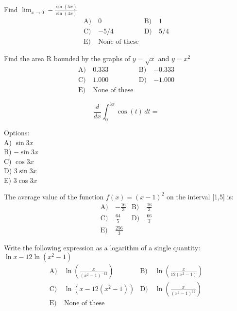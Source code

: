 \begin{problem}\label{PreCal-7}
Find $\lim _{x \rightarrow 0}-\frac{\sin (5 x)}{\sin (4 x)}$
\begin{align*}
\text{A)}\ & 0 &
\text{B)}\ &  1\\
\text{C)}\ & -5/4  &
\text{D)}\ & 5/4 \\
\text{E)}\ & \text{None of these}&
\end{align*}    
\end{problem}


\begin{problem}\label{PreCal-8}
Find the area $\mathrm{R}$ bounded by the graphs of $y=\sqrt{x}$ and $y=x^{2}$
\begin{align*}
\text{A)}\ & 0.333 &
\text{B)}\ & -0.333 \\
\text{C)}\ &  1.000 &
\text{D)}\ & -1.000\\
\text{E)}\ & \text{None of these}&
\end{align*}    
\end{problem}


\begin{problem}\label{AI-Calculus5}
\[
\frac{d}{dx} \int_{0}^{3x} \cos(t) \, dt =
\]

\noindent Options:\\
A) \( \sin 3x \)\\
B) \( -\sin 3x \)\\
C) \( \cos 3x \)\\
D) \( 3 \sin 3x \)\\
E) \( 3 \cos 3x \)
\end{problem}



\begin{problem}\label{PreCal-10}
The average value of the function $f(x)=(x-1)^{2}$ on the interval [1,5] is:
\begin{align*}
\text{A)}\ & -\frac{16}{3} &
\text{B)}\ & \frac{16}{3} \\
\text{C)}\ & \frac{64}{5}  &
\text{D)}\ & \frac{66}{3}\\
\text{E)}\ & \frac{256}{3}  &
\end{align*}    
\end{problem}


\begin{problem}\label{PreCal-11}
Write the following expression as a logarithm of a single quantity: $\ln x-12 \ln \left(x^{2}-1\right)$
\begin{align*}
\text{A)}\ &  \ln \left(\frac{x}{\left(x^{2}-1\right)^{-12}}\right)&
\text{B)}\ &  \ln \left(\frac{x}{12\left(x^{2}-1\right)}\right)\\
\text{C)}\ & \ln \left(x-12\left(x^{2}-1\right)\right)  &
\text{D)}\ & \ln \left(\frac{x}{\left(x^{2}-1\right)^{12}}\right)\\
\text{E)}\ &  \text{None of these}&
\end{align*}    
\end{problem}


